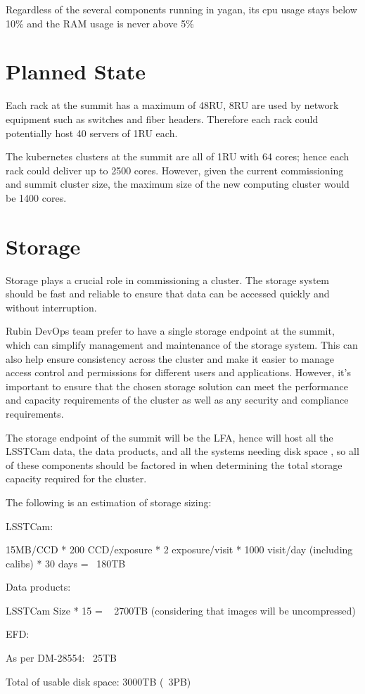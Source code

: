 Regardless of the several components running in yagan, its cpu usage stays below 10\% and the RAM usage is never above 5\%


\section{Planned State}

Each rack at the summit has a maximum of 48RU, 8RU are used by network equipment such as switches and fiber headers. Therefore each rack could potentially host 40 servers of 1RU each.

The kubernetes clusters at the summit are all of 1RU with 64 cores; hence each rack could deliver up to 2500 cores. However, given the current commissioning and summit cluster size, the maximum size of the new computing cluster would be 1400 cores. 

\section{Storage}

Storage plays a crucial role in commissioning a cluster. The storage system should be fast and reliable to ensure that data can be accessed quickly and without interruption.

Rubin DevOps team prefer to have a single storage endpoint at the summit, which can simplify management and maintenance of the storage system. This can also help ensure consistency across the cluster and make it easier to manage access control and permissions for different users and applications. However, it's important to ensure that the chosen storage solution can meet the performance and capacity requirements of the cluster as well as any security and compliance requirements. 

The storage endpoint of the summit will be the LFA, hence will host all the LSSTCam data, the data products, and all the systems needing disk space , so all of these components should be factored in when determining the total storage capacity required for the cluster.

The following is an estimation of storage sizing:

LSSTCam:

15MB/CCD * 200 CCD/exposure * 2 exposure/visit * 1000 visit/day (including calibs) * 30 days = ~180TB

Data products:

LSSTCam Size * 15 = ~ 2700TB (considering that images will be uncompressed)

EFD:

As per DM-28554: ~25TB

Total of usable disk space: 3000TB (~3PB) 